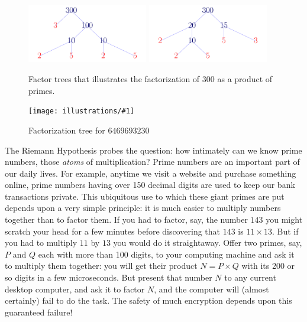 \documentclass[11pt,draft]{article}
\newcommand{\ill}[3]{ 
   \begin{figure}[H]
   \begin{center}
   \texttt{[image: illustrations/\#1]}
   \caption{#3}
   \end{center}
    \end{figure}
}
\theoremstyle{plain}
\theoremstyle{definition}
\numberwithin{equation}{section}
\numberwithin{figure}{section}
\numberwithin{table}{section}
\begin{document}
\begin{figure}[H]
\begin{center}
\includegraphics[width=0.47\textwidth]{illustrations/factor_tree_300_a}
\includegraphics[width=0.47\textwidth]{illustrations/factor_tree_300_b}
\caption{Factor trees that illustrates the factorization of 300 as a product of primes.\label{fig:factor300}}
\end{center}
\end{figure}

\ill{factor_tree_big}{1}{Factorization tree for $6469693230$\label{factor.tree.big}}
 
                        
The Riemann Hypothesis probes the question: how intimately can we know
prime numbers, those {\em atoms} of multiplication?  Prime numbers are
an important part of our daily lives.  For example, anytime we visit a
website and purchase something online, prime numbers having over 150
decimal digits are used to keep our bank transactions private.  This
ubiquitous use to which these giant primes are put depends upon a very
simple principle: it is much easier to multiply numbers together than
to factor them. If you had to factor, say, the number $143$ you might
scratch your head for a few minutes before discovering that $143$ is
$11\times 13$. But if you had to multiply $11$ by $13$ you would do it
straightaway.  Offer two primes, say, $P$ and $Q$ each with more than
100 digits, to your computing machine and ask it to multiply them
together: you will get their product $N = P\times Q$ with its 200 or
so digits in a few microseconds. But present that number $N$ to any
current desktop computer, and ask it to factor $N$, and the computer
will (almost certainly) fail to do the task. The safety of much
encryption depends upon this guaranteed failure!
\end{document}
